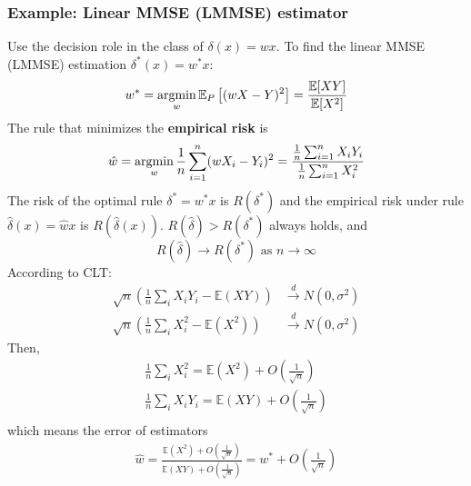 \documentclass[11pt,a4paper]{article}
\newcommand{\argmin}{\operatornamewithlimits{argmin}}
\begin{document}
\subsubsection{Example: Linear MMSE (LMMSE) estimator}
Use the decision role in the class of $\delta(x)=wx$. To find the linear MMSE (LMMSE) estimation $\delta^*(x)=w^*x$:
\begin{equation}
    \begin{aligned}
        w^*=\argmin_{w}\mathbb{E}_P\left[(wX-Y)^2\right]=\frac{\mathbb{E}[XY]}{\mathbb{E}[X^2]}
    \end{aligned}
    \nonumber
\end{equation}
The rule that minimizes the \textbf{empirical risk} is
\begin{equation}
    \begin{aligned}
        \hat{w}=\argmin_{w}\frac{1}{n}\sum_{i=1}^n(wX_i-Y_i)^2=\frac{\frac{1}{n}\sum_{i=1}^nX_iY_i}{\frac{1}{n}\sum_{i=1}^nX_i^2}
    \end{aligned}
    \nonumber
\end{equation}
The risk of the optimal rule $\delta^*=w^*x$ is $R(\delta^*)$ and the empirical risk under rule $\hat{\delta}(x)=\hat{w}x$ is $R(\hat{\delta}(x))$. $R(\hat{\delta})>R(\delta^*)$ always holds, and $$R(\hat{\delta})\rightarrow R(\delta^*)\text{ as }n \rightarrow \infty$$
According to CLT:
\begin{equation}
    \begin{aligned}
        \sqrt{n}\left(\frac{1}{n}\sum_iX_iY_i- \mathbb{E}(XY)\right) &\stackrel{d}{\longrightarrow} N(0,\sigma^2)\\
        \sqrt{n}\left(\frac{1}{n}\sum_iX_i^2- \mathbb{E}(X^2)\right) &\stackrel{d}{\longrightarrow} N(0,\sigma^2)
    \end{aligned}
    \nonumber
\end{equation}
Then,
\begin{equation}
    \begin{aligned}
        \frac{1}{n}\sum_iX_i^2=\mathbb{E}(X^2)+O(\frac{1}{\sqrt{n}})\\
        \frac{1}{n}\sum_iX_iY_i=\mathbb{E}(XY)+O(\frac{1}{\sqrt{n}})\\
    \end{aligned}
    \nonumber
\end{equation}
which means the error of estimators
\begin{equation}
    \begin{aligned}
        \hat{w}=\frac{\mathbb{E}(X^2)+O(\frac{1}{\sqrt{n}})}{\mathbb{E}(XY)+O(\frac{1}{\sqrt{n}})}=w^*+O(\frac{1}{\sqrt{n}})
    \end{aligned}
    \nonumber
\end{equation}
\end{document}
